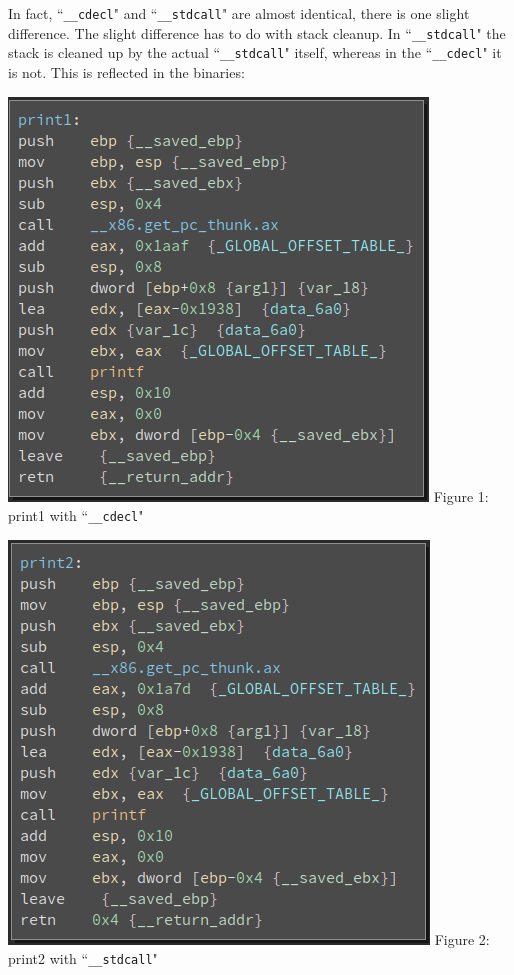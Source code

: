 \documentclass[12pt]{article}
\begin{document}
In fact, ``\texttt{\_\_cdecl}" and ``\texttt{\_\_stdcall}" are almost identical, there is one slight difference. The slight difference has
to do with stack cleanup. In ``\texttt{\_\_stdcall}" the stack is cleaned up by the actual ``\texttt{\_\_stdcall}" itself, whereas in the
``\texttt{\_\_cdecl}" it is not. This is reflected in the binaries:
\begin{multicols}{2}
	\begin{center}
		\includegraphics[width=\linewidth]{print1.png}
		Figure 1: print1 with ``\texttt{\_\_cdecl}"
		
	\end{center}

	\columnbreak

	\begin{center}
		\includegraphics[width=\linewidth]{print2.png}
		Figure 2: print2 with ``\texttt{\_\_stdcall}"
	\end{center}
\end{multicols}
\end{document}
